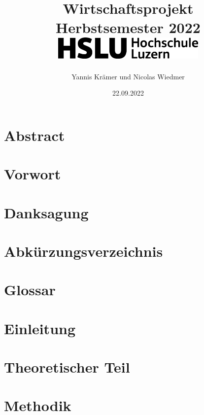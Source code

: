 \documentclass[a4paper]{article}
\title{
    {Wirtschaftsprojekt} \\
    \vspace{10mm}
    { Herbstsemester 2022 } \\
    \vspace{10mm}
    {\includegraphics[width=75mm]{img/hsluLogo2022.png}}
}
\author{Yannis Krämer und Nicolas Wiedmer}
\date{22.09.2022}
\begin{document}
\maketitle

\newpage

\tableofcontents

\newpage

\section{Abstract}


\newpage

\section{Vorwort}


\section{Danksagung}


\section{Abkürzungsverzeichnis}


\section{Glossar}


\section{Einleitung}


\section{Theoretischer Teil}


\section{Methodik}
\end{document}
